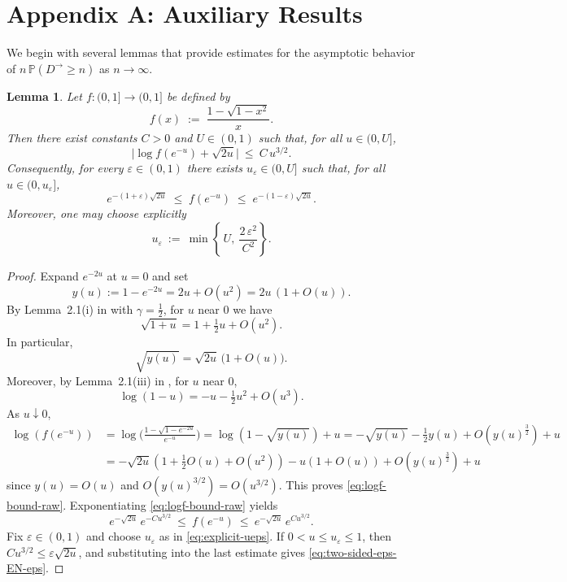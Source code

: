 \documentclass[preprint]{imsart}
\newcommand{\PP}{\mathbb{P}}
\newcommand{\1}{\mathbf{1}}
\theoremstyle{plain}
\newtheorem{lemma}[theorem]{Lemma}
\theoremstyle{definition}
\begin{document}
\section{Appendix A: Auxiliary Results}\label{sec:auxiliary-results}

We begin with several lemmas that provide estimates for the asymptotic behavior of
\(n\,\PP(D^{\rightarrow}\ge n)\) as \(n\to\infty\).


\begin{lemma}\label{lem:two-sided-exp-EN}
Let \(f:(0,1]\to(0,1]\) be defined by
\[
f(x)\;:=\;\frac{1-\sqrt{1-x^{2}}}{x}.
\]
Then there exist constants \(C>0\) and \(U\in(0,1)\) such that, for all \(u\in(0,U]\),
\begin{equation}\label{eq:logf-bound-raw}
\bigl|\log f(e^{-u})+\sqrt{2u}\bigr|\ \le\ C\,u^{3/2}.
\end{equation}
Consequently, for every \(\varepsilon\in(0,1)\) there exists \(u_\varepsilon\in(0,U]\) such that, for all \(u\in(0,u_\varepsilon]\),
\begin{equation}\label{eq:two-sided-eps-EN-eps}
e^{-(1+\varepsilon)\sqrt{2u}}
\;\le\;
f(e^{-u})
\;\le\;
e^{-(1-\varepsilon)\sqrt{2u}}.
\end{equation}
Moreover, one may choose explicitly
\begin{equation}\label{eq:explicit-ueps}
u_\varepsilon\ :=\ \min\!\left\{\,U,\ \frac{2\,\varepsilon^2}{C^2}\right\}.
\end{equation}
\end{lemma}

\begin{proof}
Expand \(e^{-2u}\) at \(u=0\) and set
\[
y(u):=1-e^{-2u}=2u+O(u^{2})=2u\,(1+O(u)).
\]
By Lemma~2.1(i) in \cite{JGF} with \(\gamma=\tfrac12\), for \(u\) near \(0\) we have
\[
\sqrt{1+u}=1+\tfrac12 u+O(u^{2}).
\]
In particular,
\[
\sqrt{y(u)}=\sqrt{2u}\,\bigl(1+O(u)\bigr).
\]
Moreover, by Lemma~2.1(iii) in \cite{JGF}, for \(u\) near \(0\),
\[
\log(1-u)=-u-\tfrac12 u^{2}+O(u^{3}).
\]
As \(u\downarrow0\),
\begin{equation*}
\begin{split}
  \log(f(e^{-u}))&=\log\Bigg(\frac{1-\sqrt{1-e^{-2u}}}{e^{-u}}\Bigg)= \log(1-\sqrt{y(u)})+u=-\sqrt{y(u)}-\frac{1}{2}y(u)+O(y(u)^{\frac{3}{2}})+u\\
  &=-\sqrt{2u}(1+\frac{1}{2}O(u)+O(u^2)) -u(1+O(u))+O(y(u)^{\frac{3}{2}})+u
\end{split}
\end{equation*}
since \(y(u)=O(u)\) and \(O(y(u)^{3/2})=O(u^{3/2})\). This proves \eqref{eq:logf-bound-raw}. Exponentiating \eqref{eq:logf-bound-raw} yields
\[
e^{-\sqrt{2u}}\,e^{-C u^{3/2}}
\ \le\ f(e^{-u})\ \le\
e^{-\sqrt{2u}}\,e^{C u^{3/2}}.
\]
Fix \(\varepsilon\in(0,1)\) and choose \(u_\varepsilon\) as in \eqref{eq:explicit-ueps}. If \(0<u\le u_\varepsilon\le 1\), then \(C u^{3/2}\le \varepsilon \sqrt{2u}\), and substituting into the last estimate gives \eqref{eq:two-sided-eps-EN-eps}.
\end{proof}
\end{document}
